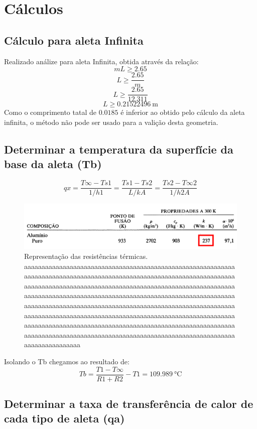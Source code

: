 \chapter{Cálculos}\label{cap:calculus}

\section{Cálculo para aleta Infinita}\label{sec:infity}

Realizado análize para aleta Infinita, obtida através da relação:\\
\begin{equation}
    {m}{L}\geq{2.65}
\end{equation}
\begin{equation}
    {L}\geq{\frac{2.65}{m}}
\end{equation}
\begin{equation}
    {L}\geq{\frac{2.65}{12.311 }}
\end{equation}
\begin{equation}
    {L}\geq{\SI{0.21522496}\meter}
\end{equation}
Como o comprimento tatal de \(0.0185\) é inferior ao obtido pelo cálculo da aleta infinita, o método não pode ser usado para a valição desta geometria.

\section{Determinar a temperatura da superfície da base da aleta (Tb)}\label{sec:prob1}

\begin{equation}
    {qx}={\frac{T\infty-Ts1}{1/{h1}}}={\frac{Ts1-Ts2}{L/{{k}{A}}}}={\frac{Ts2-T\infty2}{1/{h2}{A}}}
\end{equation}

\begin{figure}[h]
    \centering
    \caption{Representação das resistências térmicas. aaaaaaaaaaaaaaaaaaaaaaaaaaaaaaaaaaaaaaaaaaaaaaaaaaaaaaaaaaaaaaaaaaaaaaaaaaaaaaaaaaaaaaaaaaaaaaaaaaaaaaaaaaaaaaaaaaaaaaaaaaaaaaaaaaaaaaaaaaaaaaaaaaaaaaaaaaaaaaaaaaaaaaaaaaaaaaaaaaaaaaaaaaaaaaaaaaaaaaaaaaaaaaaaaaaaaaaaaaaaaaaaaaaaaaaaaaaaaaaaaaaaaaaaaaaaaaaaaaaaaaaaaaaaaaaaaaaaaaaaaaaaaaaaaaaaaaaaaaaaaaaaaaaaaaaaaaaaaaaaaaaaaaaaaaaaaaaaaaaaaaaaaaaaaaaaaaaaaaaaaaaaaaaaaaaaaaaaaaaaaaaaaaaaaaaaaaaaaaaaaaaaaaaaaaaaaaaaaaaaaaaaaaaaaaaaaaaaaaaaaaaaaaaaaaaaaaaaaaaaaaaaaaaaaaaaaaaaaaaaaaaaaaaaaaaaaaaa}
    \label{fig:res}
    \includegraphics[width=14cm]{figuras/metalProps.jpg}
    \fonteproprioautor
\end{figure}

Isolando o Tb chegamos ao resultado de:
\begin{equation}
    {Tb}={\frac{T1 -T\infty}{{R1}+{R2}}}-{T1} = \SI{109.989}{\degreeCelsius}
\end{equation}

\section{Determinar a taxa de transferência de calor de cada tipo de aleta (qa)}\label{sec:prob1}

